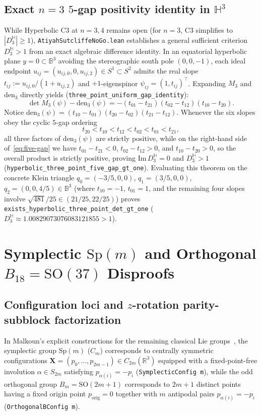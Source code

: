 \documentclass[11pt,reqno]{amsart}
\theoremstyle{remark}
\newcommand{\R}{\mathbb{R}}
\newcommand{\B}{\mathbb{B}}
\newcommand{\Hy}{\mathbb{H}}
\begin{document}
\subsection{Exact $n = 3$ $5$-gap positivity identity in $\Hy^3$}
While Hyperbolic C3 at $n = 3, 4$ remains open (for $n = 3$, C3 simplifies to $|D_3^{\Hy}| \ge 1$), \texttt{AtiyahSutcliffeNoGo.lean} establishes a general sufficient criterion $D_3^{\Hy} > 1$ from an exact algebraic difference identity.
In an equatorial hyperbolic plane $y = 0 \subset \B^3$ avoiding the stereographic south pole $(0, 0, -1)$, each ideal endpoint $u_{ij} = (u_{ij,0}, 0, u_{ij,2}) \in S^1 \subset S^2$ admits the real slope $t_{ij} := u_{ij,0} / (1 + u_{ij,2})$ and $+1$-eigenspinor $\psi_{ij} = (1, t_{ij})^\top$.
Expanding $M_3$ and $\mathrm{den}_3$ directly yields (\texttt{three\_point\_uniform\_gap\_identity}):
\begin{equation}\label{eq:five-gap}
  \det M_3(\psi) - \mathrm{den}_3(\psi) = -(t_{01} - t_{21})(t_{02} - t_{12})(t_{10} - t_{20}).
\end{equation}
Notice $\mathrm{den}_3(\psi) = (t_{10} - t_{01})(t_{20} - t_{02})(t_{21} - t_{12})$.
Whenever the six slopes obey the cyclic $5$-gap ordering
\[
  t_{20} < t_{10} < t_{12} < t_{02} < t_{01} < t_{21},
\]
all three factors of $\mathrm{den}_3(\psi)$ are strictly positive, while on the right-hand side of~\eqref{eq:five-gap} we have $t_{01} - t_{21} < 0$, $t_{02} - t_{12} > 0$, and $t_{10} - t_{20} > 0$, so the overall product is strictly positive, proving $\mathrm{Im}\, D_3^{\Hy} = 0$ and $D_3^{\Hy} > 1$ (\texttt{hyperbolic\_three\_point\_five\_gap\_gt\_one}).
Evaluating this theorem on the concrete Klein triangle $q_0 = (-3/5, 0, 0)$, $q_1 = (3/5, 0, 0)$, $q_2 = (0, 0, 4/5) \in \B^3$ (where $t_{10} = -1$, $t_{01} = 1$, and the remaining four slopes involve $\sqrt{481}/25 \in (21/25, 22/25)$) proves \texttt{exists\_hyperbolic\_three\_point\_det\_gt\_one} ($D_3^{\Hy} \approx 1.00829073076083121855 > 1$).

\section{Symplectic $\mathrm{Sp}(m)$ and Orthogonal $B_{18} = \mathrm{SO}(37)$ Disproofs}\label{sec:symplectic}

\subsection{Configuration loci and $z$-rotation parity-subblock factorization}
In Malkoun's explicit constructions for the remaining classical Lie groups~\cite{Malkoun2014,Malkoun2015}, the symplectic group $\mathrm{Sp}(m)$ ($C_m$) corresponds to centrally symmetric configurations $\mathbf{X} = (p_0, \dots, p_{2m-1}) \in C_{2m}(\R^3)$ equipped with a fixed-point-free involution $\alpha \in S_{2m}$ satisfying $p_{\alpha(i)} = -p_i$ (\texttt{SymplecticConfig m}), while the odd orthogonal group $B_m = \mathrm{SO}(2m+1)$ corresponds to $2m+1$ distinct points having a fixed origin point $p_{\mathrm{orig}} = 0$ together with $m$ antipodal pairs $p_{\alpha(i)} = -p_i$ (\texttt{OrthogonalBConfig m}).
\end{document}

